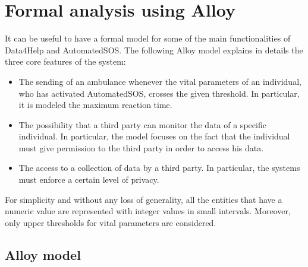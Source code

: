 \chapter{Formal analysis using Alloy}
It can be useful to have a formal model for some of the main functionalities of Data4Help and AutomatedSOS. The following Alloy model explains in details the three core features of the system:

\begin{itemize}
\item The sending of an ambulance whenever the vital parameters of an individual, who has activated AutomatedSOS, crosses the given threshold. In particular, it is modeled the maximum reaction time.
\item The possibility that a third party can monitor the data of a specific individual. In particular, the model focuses on the fact that the individual must give permission to the third party in order to access his data.
\item The access to a collection of data by a third party. In particular, the systems must enforce a certain level of privacy.
\end{itemize}
For simplicity and without any loss of generality, all the entities that have a numeric value are represented with integer values in small intervals. Moreover, only upper thresholds for vital parameters are considered.

\section{Alloy model}



